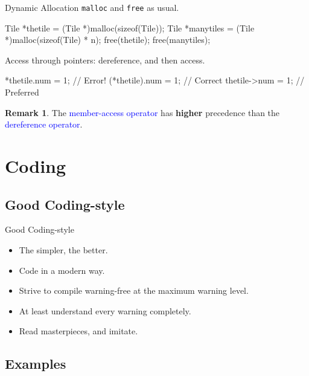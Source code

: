 \documentclass{beamer}
\newcommand{\blue}[1]{\textcolor{blue}{#1}}
\newcommand{\ttt}[1]{\texttt{#1}}
\theoremstyle{definition}
\newtheorem{rmk}{Remark}
\begin{document}
\begin{frame}[fragile]{Dynamic Allocation}
    \ttt{malloc} and \ttt{free} as usual.
    \begin{cpp}
Tile *thetile
  = (Tile *)malloc(sizeof(Tile));
Tile *manytiles
  = (Tile *)malloc(sizeof(Tile) * n);
free(thetile); free(manytiles);
    \end{cpp}
    \pause
    Access through pointers: dereference, and then access.
    \begin{cpp}
*thetile.num = 1;   // Error!
(*thetile).num = 1; // Correct
thetile->num = 1;   // Preferred
    \end{cpp}
    \begin{rmk}
        The \blue{member-access operator} has \textbf{higher} precedence than the \blue{dereference operator}.
    \end{rmk}
\end{frame}

\section{Coding}

\subsection{Good Coding-style}

\begin{frame}{Good Coding-style}
    \begin{itemize}
        \item The simpler, the better.
        \item Code in a modern way.
        \item Strive to compile warning-free at the maximum warning level.
        \item At least understand every warning completely.
        \item Read masterpieces, and imitate.
    \end{itemize}
\end{frame}

\subsection{Examples}
\end{document}
